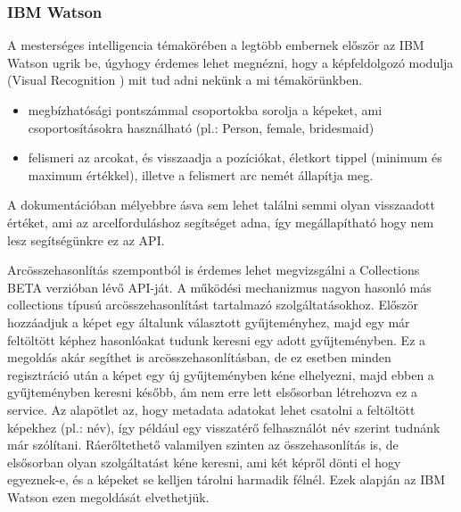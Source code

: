 \subsubsection{IBM Watson}
A mesterséges intelligencia témakörében a legtöbb embernek először az IBM Watson ugrik be, úgyhogy érdemes lehet megnézni, hogy a képfeldolgozó modulja (Visual Recognition \cite{IBMWatson}) mit tud adni nekünk a mi témakörünkben. 
\begin{itemize}
\item megbízhatósági pontszámmal csoportokba sorolja a képeket, ami csoportosításokra használható (pl.: Person, female, bridesmaid)
\item felismeri az arcokat, és visszaadja a pozíciókat, életkort tippel (minimum és maximum értékkel), illetve a felismert arc nemét állapítja meg.
\end{itemize}

A dokumentációban\cite{WATSON_DETECT} mélyebbre ásva sem lehet találni semmi olyan visszaadott értéket, ami az arcelforduláshoz segítséget adna, így megállapítható hogy nem lesz segítségünkre ez az API.

Arcösszehasonlítás szempontból is érdemes lehet megvizsgálni a Collections BETA\cite{WATSON_COLLECTIONS} verzióban lévő API-ját. A működési mechanizmus nagyon hasonló más collections típusú arcösszehasonlítást tartalmazó szolgáltatásokhoz. Először hozzáadjuk a képet egy általunk választott gyűjteményhez, majd egy már feltöltött képhez hasonlóakat tudunk keresni egy adott gyűjteményben. Ez a megoldás akár segíthet is arcösszehasonlításban, de ez esetben minden regisztráció után a képet egy új gyűjteményben kéne elhelyezni, majd ebben a gyűjteményben keresni később, ám nem erre lett elsősorban létrehozva ez a service. Az alapötlet az, hogy metadata adatokat lehet csatolni a feltöltött képekhez (pl.: név), így például egy visszatérő felhasználót név szerint tudnánk már szólítani. Ráerőltethető valamilyen szinten az összehasonlítás is, de elsősorban olyan szolgáltatást kéne keresni, ami két képről dönti el hogy egyeznek-e, és a képeket se kelljen tárolni harmadik félnél. Ezek alapján az IBM Watson ezen megoldását elvethetjük.

